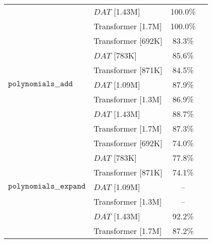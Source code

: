 \begin{tabular}{l|l|cc}
                                     & $DAT$ [1.43M] &                   100.0\% \\
                                     & Transformer [1.7M] &                   100.0\% \\
    \cline{1-3}
    \multirow{7}{*}{$\texttt{polynomials\_\_add}$} & Transformer [692K] &                    83.3\% \\
                                     & $DAT$ [783K] &                    85.6\% \\
                                     & Transformer [871K] &                    84.5\% \\
                                     & $DAT$ [1.09M] &                    87.9\% \\
                                     & Transformer [1.3M] &                    86.9\% \\
                                     & $DAT$ [1.43M] &                    88.7\% \\
                                     & Transformer [1.7M] &                    87.3\% \\
    \cline{1-3}
    \multirow{7}{*}{$\texttt{polynomials\_\_expand}$} & Transformer [692K] &                    74.0\% \\
                                     & $DAT$ [783K] &                    77.8\% \\
                                     & Transformer [871K] &                    74.1\% \\
                                     & $DAT$ [1.09M] &                        -- \\
                                     & Transformer [1.3M] &                        -- \\
                                     & $DAT$ [1.43M] &                    92.2\% \\
                                     & Transformer [1.7M] &                    87.2\% \\
    \bottomrule
\end{tabular}
